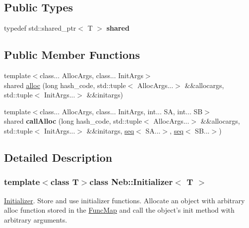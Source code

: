 \subsection*{\-Public \-Types}
\begin{DoxyCompactItemize}
\item 
\hypertarget{classNeb_1_1Initializer_a50e05ce7fe54c798cd00495214bf2df4}{typedef std\-::shared\-\_\-ptr$<$ \-T $>$ {\bfseries shared}}\label{classNeb_1_1Initializer_a50e05ce7fe54c798cd00495214bf2df4}

\end{DoxyCompactItemize}
\subsection*{\-Public \-Member \-Functions}
\begin{DoxyCompactItemize}
\item 
{\footnotesize template$<$class... \-Alloc\-Args, class... \-Init\-Args$>$ }\\shared \hyperlink{classNeb_1_1Initializer_aa6c409694511459956b7cfbc27feb8fc}{alloc} (long hash\-\_\-code, std\-::tuple$<$ \-Alloc\-Args...$>$ \&\&allocargs, std\-::tuple$<$ \-Init\-Args...$>$ \&\&initargs)
\item 
\hypertarget{classNeb_1_1Initializer_ad30f8a193fa13c284fd20cd516ed0b78}{{\footnotesize template$<$class... \-Alloc\-Args, class... \-Init\-Args, int... \-S\-A, int... \-S\-B$>$ }\\shared {\bfseries call\-Alloc} (long hash\-\_\-code, std\-::tuple$<$ \-Alloc\-Args...$>$ \&\&allocargs, std\-::tuple$<$ \-Init\-Args...$>$ \&\&initargs, \hyperlink{structseq}{seq}$<$ \-S\-A...$>$, \hyperlink{structseq}{seq}$<$ \-S\-B...$>$)}\label{classNeb_1_1Initializer_ad30f8a193fa13c284fd20cd516ed0b78}

\end{DoxyCompactItemize}


\subsection{\-Detailed \-Description}
\subsubsection*{template$<$class T$>$class Neb\-::\-Initializer$<$ T $>$}

\hyperlink{classNeb_1_1Initializer}{\-Initializer}. \-Store and use initializer functions. \-Allocate an object with arbitrary alloc function stored in the \hyperlink{classNeb_1_1FuncMap}{\-Func\-Map} and call the object's {\ttfamily init} method with arbitrary arguments. 


